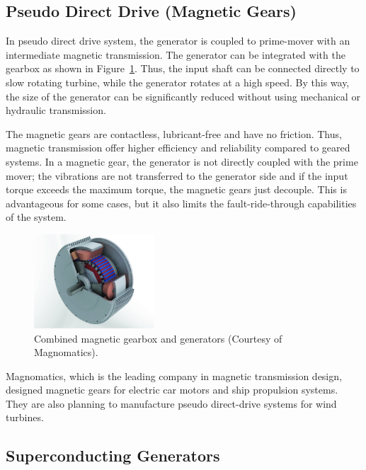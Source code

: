 \documentclass[a4paper, 11pt]{article} %
\begin{document}
\subsection{Pseudo Direct Drive (Magnetic Gears)}

In pseudo direct drive system, the generator is coupled to prime-mover with an intermediate magnetic transmission. The generator can be integrated with the gearbox as shown in Figure~\ref{magnomatics}. Thus, the input shaft can be connected directly to slow rotating turbine, while the generator rotates at a high speed. By this way, the size of the generator can be significantly reduced without using mechanical or hydraulic transmission.

The magnetic gears are contactless, lubricant-free and have no friction. Thus, magnetic transmission offer higher efficiency and reliability compared to geared systems. In a magnetic gear, the generator is not directly coupled with the prime mover; the vibrations are not transferred to the generator side and if the input torque exceeds the maximum torque, the magnetic gears just decouple. This is advantageous for some cases, but it also limits the fault-ride-through capabilities of the system.

  \begin{figure}[t]
    \centering
    \includegraphics[width=0.4\textwidth]{magnomatics}
    \caption{Combined magnetic gearbox and generators (Courtesy of Magnomatics).} 
    \label{magnomatics}
  \end{figure}


Magnomatics, which is the leading company in magnetic transmission design, designed magnetic gears for electric car motors and ship propulsion systems. They are also planning to manufacture pseudo direct-drive systems for wind turbines.

\subsection{Superconducting Generators}
\end{document}
